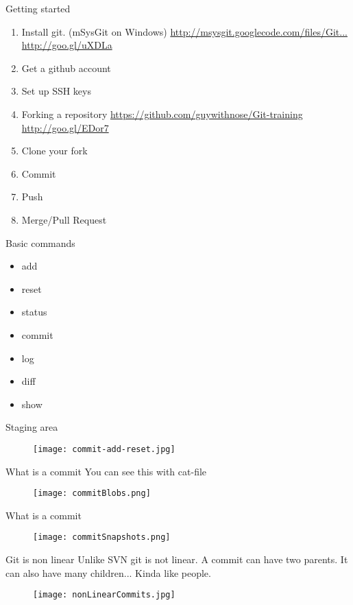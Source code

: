\documentclass[14pt]{beamer}
\begin{document}
\begin{frame}{Getting started}
	\begin{enumerate}
		\small
		\item Install git. (mSysGit on Windows)\newline
		\href{http://msysgit.googlecode.com/files/Git-1.7.11-preview20120710.exe}{http://msysgit.googlecode.com/files/Git...}
		\href{http://goo.gl/uXDLa}{http://goo.gl/uXDLa}
		\item Get a github account
		\item Set up SSH keys
		\item Forking a repository\newline
		\href{https://github.com/guywithnose/Git-training}{https://github.com/guywithnose/Git-training}
		\href{http://goo.gl/EDor7}{http://goo.gl/EDor7}
		\item Clone your fork
		\item Commit
		\item Push
		\item Merge/Pull Request
	\end{enumerate}
\end{frame}


\begin{frame}{Basic commands}
	\begin{itemize}
		\item add
		\item reset
		\item status
		\item commit
		\item log
		\item diff
		\item show
	\end{itemize}
\end{frame}

\begin{frame}{Staging area}
	\begin{figure}[htb]
		\centering
		\texttt{[image: commit-add-reset.jpg]}
	\end{figure}
\end{frame}

\begin{frame}{What is a commit}
	You can see this with cat-file
	\begin{figure}[htb]
		\centering
		\texttt{[image: commitBlobs.png]}
	\end{figure}
\end{frame}

\begin{frame}{What is a commit}
	\begin{figure}[htb]
		\centering
		\texttt{[image: commitSnapshots.png]}
	\end{figure}
\end{frame}

\begin{frame}{Git is non linear}
	Unlike SVN git is not linear.  A commit can have two parents.  It can also have many children... Kinda like people.
	\begin{figure}[htb]
		\centering
		\texttt{[image: nonLinearCommits.jpg]}
	\end{figure}
\end{frame}
\end{document}
